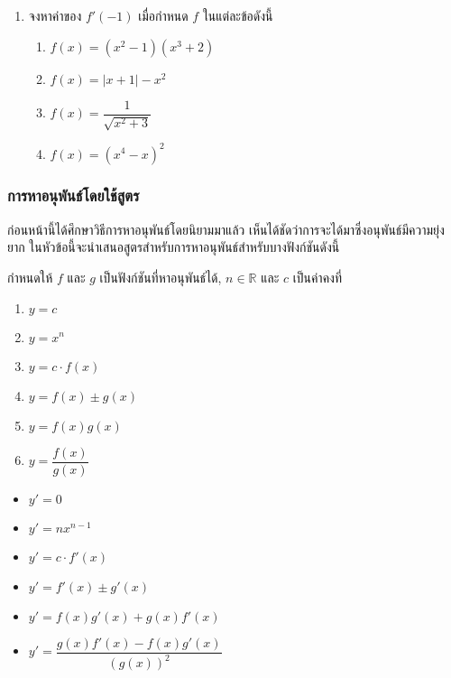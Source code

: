 \documentclass[hidelinks,12pt,a4paper]{article}
\begin{document}
\begin{enumerate}
    \vspace{70mm}
    \item จงหาค่าของ $f'(-1)$ เมื่อกำหนด $f$ ในแต่ละข้อดังนี้
    \begin{multicols}{2}
    \begin{enumerate}
        \renewcommand{\labelenumii}{\arabic{enumii})}
        \item $f(x)=(x^2-1)(x^3+2)$
        \vspace{60mm}
        \item $f(x)=|x+1|-x^2$
        \item $f(x)=\dfrac{1}{\sqrt{x^2+3}}$
        \vspace{60mm}
        \item $f(x)=(x^4-x)^2$
    \end{enumerate}
    \end{multicols}
\end{enumerate}
\newpage
\subsubsection{การหาอนุพันธ์โดยใช้สูตร}
ก่อนหน้านี้ได้ศึกษาวิธีการหาอนุพันธ์โดยนิยามมาแล้ว เห็นได้ชัดว่าการจะได้มาซึ่งอนุพันธ์มีความยุ่งยาก ในหัวข้อนี้จะนำเสนอสูตรสำหรับการหาอนุพันธ์สำหรับบางฟังก์ชันดังนี้

\begin{tcolorbox}[sharp corners, colback=green!30, colframe=green!80!blue]
    กำหนดให้ $f$ และ $g$ เป็นฟังก์ชันที่หาอนุพันธ์ได้, $n\in\mathbb{R}$ และ $c$ เป็นค่าคงที่
    
    \vspace{1.5mm}
    \begin{minipage}{0.35\textwidth}
    \begin{enumerate}
        \item $y=c$ 
        \item $y=x^n$
        \item $y=c\cdot f(x)$
        \item $y=f(x)\pm g(x)$
        \item $y=f(x)g(x)$
        \item $y=\dfrac{f(x)}{g(x)}$
    \end{enumerate}
    \end{minipage}
    \begin{minipage}{0.45\textwidth}
    \begin{itemize}[label={จะได้ว่า \hspace{0.5mm}}]
        \item $y'=0$ 
        \item $y'=nx^{n-1}$
        \item $y'=c\cdot f'(x)$
        \item $y'=f'(x)\pm g'(x)$
        \item $y'=f(x)g'(x)+g(x)f'(x)$
        \item $y'=\dfrac{g(x)f'(x)-f(x)g'(x)}{\left(g(x)\right)^2}$
    \end{itemize}
    \end{minipage}
\end{tcolorbox}
\end{document}
